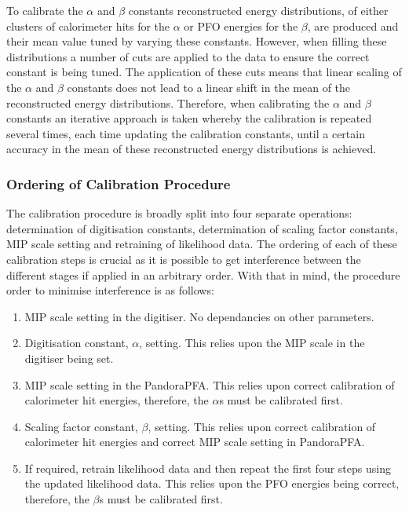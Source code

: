To calibrate the $\alpha$ and $\beta$ constants reconstructed energy distributions, of either clusters of calorimeter hits for the $\alpha$ or PFO energies for the $\beta$, are produced and their mean value tuned by varying these constants.  However, when filling these distributions a number of cuts are applied to the data to ensure the correct constant is being tuned.  The application of these cuts means that linear scaling of the $\alpha$ and $\beta$ constants does not lead to a linear shift in the mean of the reconstructed energy distributions.  Therefore, when calibrating the $\alpha$ and $\beta$ constants an iterative approach is taken whereby the calibration is repeated several times, each time updating the calibration constants, until a certain accuracy in the mean of these reconstructed energy distributions is achieved.  


\subsubsection{Ordering of Calibration Procedure}
The calibration procedure is broadly split into four separate operations: determination of digitisation constants, determination of scaling factor constants, MIP scale setting and retraining of likelihood data.  The ordering of each of these calibration steps is crucial as it is possible to get interference between the different stages if applied in an arbitrary order.  With that in mind, the procedure order to minimise interference is as follows:

\begin{enumerate} 
\item MIP scale setting in the digitiser.  No dependancies on other parameters.  
\item Digitisation constant, $\alpha$, setting.  This relies upon the MIP scale in the digitiser being set.
\item MIP scale setting in the PandoraPFA.  This relies upon correct calibration of calorimeter hit energies, therefore, the $\alpha$s must be calibrated first.
\item Scaling factor constant, $\beta$, setting.  This relies upon correct calibration of calorimeter hit energies and correct MIP scale setting in PandoraPFA.
\item If required, retrain likelihood data and then repeat the first four steps using the updated likelihood data.  This relies upon the PFO energies being correct, therefore, the $\beta$s must be calibrated first.  
\end{enumerate} 


